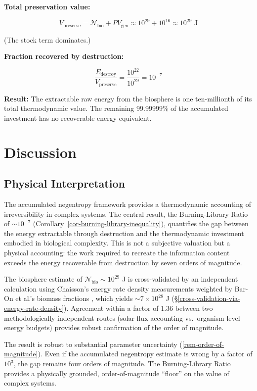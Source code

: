 \documentclass[11pt]{article}
\theoremstyle{plain}
\theoremstyle{definition}
\theoremstyle{remark}
\let\origsection\section
\renewcommand{\section}{\needspace{12\baselineskip}\origsection}
\let\origsubsection\subsection
\renewcommand{\subsection}{\needspace{7\baselineskip}\origsubsection}
\begin{document}
\textbf{Total preservation value:}

\[V_{\text{preserve}} = \mathcal{N}_{\text{bio}} + PV_{\text{gen}} \approx 10^{29} + 10^{16} \approx 10^{29} \text{ J}\]

(The stock term dominates.)

\textbf{Fraction recovered by destruction:}

\[\frac{E_{\text{destroy}}}{V_{\text{preserve}}} = \frac{10^{22}}{10^{29}} = 10^{-7}\]

\textbf{Result:} The extractable raw energy from the biosphere is one
ten-millionth of its total thermodynamic value. The remaining 99.99999\%
of the accumulated investment has no recoverable energy equivalent.

\section{Discussion}\label{discussion}

\subsection{Physical Interpretation}\label{physical-interpretation}

The accumulated negentropy framework provides a thermodynamic accounting
of irreversibility in complex systems. The central result, the
Burning-Library Ratio of \(\sim 10^{-7}\)
(Corollary~\ref{cor-burning-library-inequality}), quantifies the gap
between the energy extractable through destruction and the thermodynamic
investment embodied in biological complexity. This is not a subjective
valuation but a physical accounting: the work required to recreate the
information content exceeds the energy recoverable from destruction by
seven orders of magnitude.

The biosphere estimate of \(\mathcal{N}_{\text{bio}} \sim 10^{29}\) J is
cross-validated by an independent calculation using Chaisson's energy
rate density measurements \citep{Chaisson2011} weighted by Bar-On et
al.'s biomass fractions \citep{BarOn2018}, which yields
\(\sim 7 \times 10^{28}\) J
(§\ref{cross-validation-via-energy-rate-density}). Agreement within a
factor of 1.36 between two methodologically independent routes (solar
flux accounting vs.~organism-level energy budgets) provides robust
confirmation of the order of magnitude.

The result is robust to substantial parameter uncertainty
(\ref{rem-order-of-magnitude}). Even if the accumulated negentropy
estimate is wrong by a factor of \(10^3\), the gap remains four orders
of magnitude. The Burning-Library Ratio provides a physically grounded,
order-of-magnitude ``floor'' on the value of complex systems.
\end{document}
